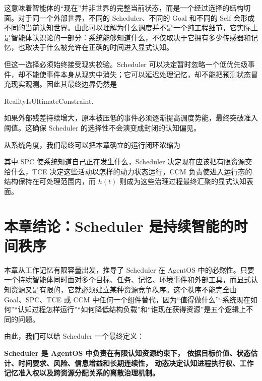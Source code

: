 这意味着智能体的“现在”并非世界的完整当前状态，而是一个经过选择的结构切面。对于同一个外部世界，不同的 Scheduler、不同的 Goal 和不同的 Self 会形成不同的当前认知世界。由此可以理解为什么调度并不是一个纯工程细节，它实际上是智能体认识论的一部分：系统能够知道什么，不仅取决于它拥有多少传感器和记忆，也取决于什么被允许在正确的时间进入显式认知。

但这一选择必须始终接受现实校验。Scheduler 可以决定暂时忽略一个低优先级事件，却不能使事件本身从现实中消失；它可以延迟处理记忆，却不能把预测状态冒充现实观测。因此其最终边界仍然是
\begin{statementbox}
RealityIsUltimateConstraint.
\end{statementbox}
如果外部残差持续增大，原本被压低的事件必须逐渐提高调度势能，最终突破准入阈值。这确保 Scheduler 的选择性不会演变成封闭的认知偏见。

从系统角度，我们最终可以把本章确立的运行闭环浓缩为
\begin{statementbox}
\centering
{}
\end{statementbox}
其中 SPC 使系统知道自己正在发生什么，Scheduler 决定现在应该把有限资源交给什么，TCE 决定这些活动以怎样的动力状态运行，CCM 负责使进入运行态的结构保持在可处理范围内，而 $h(t)$ 则成为这些治理过程最终汇聚的显式认知表面。

\section{本章结论：Scheduler 是持续智能的时间秩序}

本章从工作记忆有限容量出发，推导了 Scheduler 在 AgentOS 中的必然性。只要一个持续智能体同时面对多个目标、任务、记忆、环境事件和外部工具，而显式认知资源又是有限的，它就必须建立某种资源竞争秩序。这个秩序不能完全由 Goal、SPC、TCE 或 CCM 中任何一个组件替代，因为“值得做什么”“系统现在如何”“认知过程怎样运行”“如何降低结构负载”和“谁现在获得资源”是五个逻辑上不同的问题。

由此，我们可以给 Scheduler 一个最终定义：
\begin{center}
\begin{minipage}{.9\linewidth}
\bfseries Scheduler 是 AgentOS 中负责在有限认知资源约束下，
依据目标价值、状态估计、时间要求、风险、信息增益和长期连续性，
动态决定认知进程执行权、工作记忆准入权以及跨资源分配关系的离散治理机制。
\end{minipage}
\end{center}

